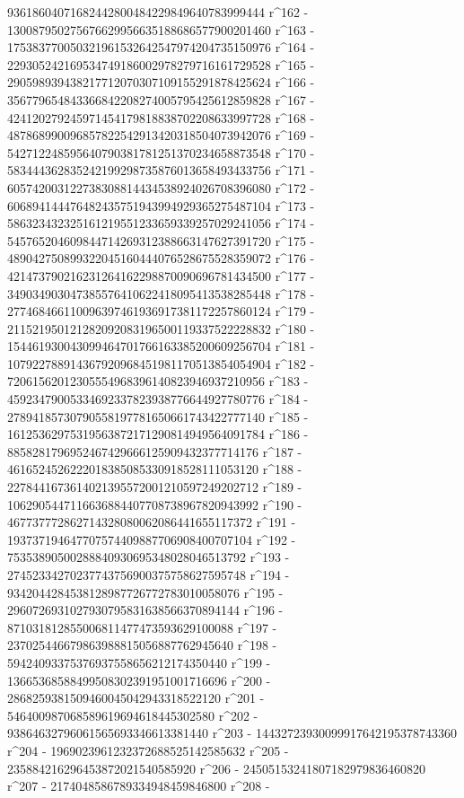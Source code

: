        93618604071682442800484229849640783999444 r^162 - 
       130087950275676629956635188686577900201460 r^163 - 
       175383770050321961532642547974204735150976 r^164 - 
       229305242169534749186002978279716161729528 r^165 - 
       290598939438217712070307109155291878425624 r^166 - 
       356779654843366842208274005795425612859828 r^167 - 
       424120279245971454179818838702208633997728 r^168 - 
       487868990096857822542913420318504073942076 r^169 - 
       542712248595640790381781251370234658873548 r^170 - 
       583444362835242199298735876013658493433756 r^171 - 
       605742003122738308814434538924026708396080 r^172 - 
       606894144476482435751943994929365275487104 r^173 - 
       586323432325161219551233659339257029241056 r^174 - 
       545765204609844714269312388663147627391720 r^175 - 
       489042750899322045160444076528675528359072 r^176 - 
       421473790216231264162298870090696781434500 r^177 - 
       349034903047385576410622418095413538285448 r^178 - 
       277468466110096397461936917381172257860124 r^179 - 
       211521950121282092083196500119337522228832 r^180 - 
       154461930043099464701766163385200609256704 r^181 - 
       107922788914367920968451981170513854054904 r^182 - 
       72061562012305554968396140823946937210956 r^183 - 
       45923479005334692337823938776644927780776 r^184 - 
       27894185730790558197781650661743422777140 r^185 - 
       16125362975319563872171290814949564091784 r^186 - 
       8858281796952467429666125909432377714176 r^187 - 
       4616524526222018385085330918528111053120 r^188 - 
       2278441673614021395572001210597249202712 r^189 - 
       1062905447116636884407708738967820943992 r^190 - 
       467737772862714328080062086441655117372 r^191 - 
       193737194647707574409887706908400707104 r^192 - 
       75353890500288840930695348028046513792 r^193 - 
       27452334270237743756900375758627595748 r^194 - 
       9342044284538128987726772783010058076 r^195 - 
       2960726931027930795831638566370894144 r^196 - 
       871031812855006811477473593629100088 r^197 - 
       237025446679863988815056887762945640 r^198 - 
       59424093375376937558656212174350440 r^199 - 
       13665368588499508302391951001716696 r^200 - 
       2868259381509460045042943318522120 r^201 - 
       546400987068589619694618445302580 r^202 - 
       93864632796061565693346613381440 r^203 - 
       14432723930099917642195378743360 r^204 - 
       1969023961232372688525142585632 r^205 - 
       235884216296453872021540585920 r^206 - 
       24505153241807182979836460820 r^207 - 
       2174048586789334948459846800 r^208 - 
